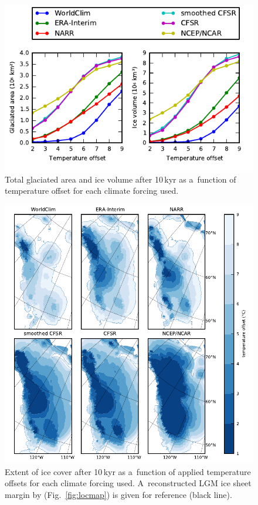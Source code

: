 \documentclass[tc, ms]{copernicus}
\begin{document}
\begin{figure}[t]
	\vspace*{2mm}
	\begin{center}
		\includegraphics{cordillera-climate-ivolarea}
	\end{center}
	\caption{Total glaciated area and ice volume after 10\,kyr as a~function of temperature offset for each climate forcing used.}
	\label{fig:ivolarea}
\end{figure}

\begin{figure}[t]
	\vspace*{2mm}
	\begin{center}
		\includegraphics{cordillera-climate-extent}
	\end{center}
	\caption{Extent of ice cover after 10\,kyr as a~function of applied temperature offsets for each climate forcing used. A~reconstructed LGM ice sheet margin by \citet{dyke-2004} (Fig.~\ref{fig:locmap}) is given for reference (black line).}
	\label{fig:extent}
\end{figure}
\end{document}
